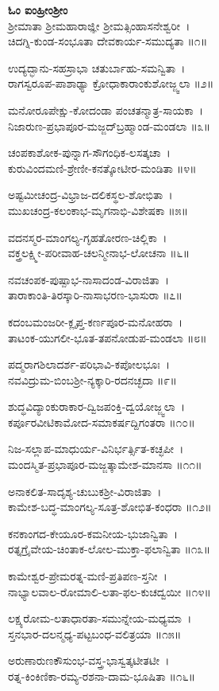 {\bfseries ಓಂ ಐಂಹ್ರೀಂಶ್ರೀಂ}\\
ಶ್ರೀಮಾತಾ ಶ್ರೀಮಹಾರಾಜ್ಞೀ ಶ್ರೀಮತ್ಸಿಂಹಾಸನೇಶ್ವರೀ~।\\
ಚಿದಗ್ನಿ-ಕುಂಡ-ಸಂಭೂತಾ ದೇವಕಾರ್ಯ-ಸಮುದ್ಯತಾ ॥೧॥

ಉದ್ಯದ್ಭಾನು-ಸಹಸ್ರಾಭಾ ಚತುರ್ಬಾಹು-ಸಮನ್ವಿತಾ~।\\
ರಾಗಸ್ವರೂಪ-ಪಾಶಾಢ್ಯಾ ಕ್ರೋಧಾಕಾರಾಂಕುಶೋಜ್ಜ್ವಲಾ ॥೨॥

ಮನೋರೂಪೇಕ್ಷು-ಕೋದಂಡಾ ಪಂಚತನ್ಮಾತ್ರ-ಸಾಯಕಾ~।\\
ನಿಜಾರುಣ-ಪ್ರಭಾಪೂರ-ಮಜ್ಜದ್‍ಬ್ರಹ್ಮಾಂಡ-ಮಂಡಲಾ ॥೩॥

ಚಂಪಕಾಶೋಕ-ಪುನ್ನಾಗ-ಸೌಗಂಧಿಕ-ಲಸತ್ಕಚಾ~।\\
ಕುರುವಿಂದಮಣಿ-ಶ್ರೇಣೀ-ಕನತ್ಕೋಟೀರ-ಮಂಡಿತಾ ॥೪॥

ಅಷ್ಟಮೀಚಂದ್ರ-ವಿಭ್ರಾಜ-ದಲಿಕಸ್ಥಲ-ಶೋಭಿತಾ~।\\
ಮುಖಚಂದ್ರ-ಕಲಂಕಾಭ-ಮೃಗನಾಭಿ-ವಿಶೇಷಕಾ ॥೫॥

ವದನಸ್ಮರ-ಮಾಂಗಲ್ಯ-ಗೃಹತೋರಣ-ಚಿಲ್ಲಿಕಾ~।\\
ವಕ್ತ್ರಲಕ್ಷ್ಮೀ-ಪರೀವಾಹ-ಚಲನ್ಮೀನಾಭ-ಲೋಚನಾ ॥೬॥

ನವಚಂಪಕ-ಪುಷ್ಪಾಭ-ನಾಸಾದಂಡ-ವಿರಾಜಿತಾ~।\\
ತಾರಾಕಾಂತಿ-ತಿರಸ್ಕಾರಿ-ನಾಸಾಭರಣ-ಭಾಸುರಾ ॥೭॥

ಕದಂಬಮಂಜರೀ-ಕ್ಲೃಪ್ತ-ಕರ್ಣಪೂರ-ಮನೋಹರಾ~।\\
ತಾಟಂಕ-ಯುಗಲೀ-ಭೂತ-ತಪನೋಡುಪ-ಮಂಡಲಾ ॥೮॥

ಪದ್ಮರಾಗಶಿಲಾದರ್ಶ-ಪರಿಭಾವಿ-ಕಪೋಲಭೂಃ~।\\
ನವವಿದ್ರುಮ-ಬಿಂಬಶ್ರೀ-ನ್ಯಕ್ಕಾರಿ-ರದನಚ್ಛದಾ ॥೯॥

ಶುದ್ಧವಿದ್ಯಾಂಕುರಾಕಾರ-ದ್ವಿಜಪಂಕ್ತಿ-ದ್ವಯೋಜ್ಜ್ವಲಾ~।\\
ಕರ್ಪೂರವೀಟಿಕಾಮೋದ-ಸಮಾಕರ್ಷದ್ದಿಗಂತರಾ ॥೧೦॥

ನಿಜ-ಸಲ್ಲಾಪ-ಮಾಧುರ್ಯ-ವಿನಿರ್ಭರ್ತ್ಸಿತ-ಕಚ್ಛಪೀ~।\\
ಮಂದಸ್ಮಿತ-ಪ್ರಭಾಪೂರ-ಮಜ್ಜತ್ಕಾಮೇಶ-ಮಾನಸಾ ॥೧೧॥

ಅನಾಕಲಿತ-ಸಾದೃಶ್ಯ-ಚುಬುಕಶ್ರೀ-ವಿರಾಜಿತಾ~।\\
ಕಾಮೇಶ-ಬದ್ಧ-ಮಾಂಗಲ್ಯ-ಸೂತ್ರ-ಶೋಭಿತ-ಕಂಧರಾ ॥೧೨॥

ಕನಕಾಂಗದ-ಕೇಯೂರ-ಕಮನೀಯ-ಭುಜಾನ್ವಿತಾ~।\\
ರತ್ನಗ್ರೈವೇಯ-ಚಿಂತಾಕ-ಲೋಲ-ಮುಕ್ತಾ-ಫಲಾನ್ವಿತಾ ॥೧೩॥

ಕಾಮೇಶ್ವರ-ಪ್ರೇಮರತ್ನ-ಮಣಿ-ಪ್ರತಿಪಣ-ಸ್ತನೀ~।\\
ನಾಭ್ಯಾಲವಾಲ-ರೋಮಾಲಿ-ಲತಾ-ಫಲ-ಕುಚದ್ವಯೀ ॥೧೪॥

ಲಕ್ಷ್ಯರೋಮ-ಲತಾಧಾರತಾ-ಸಮುನ್ನೇಯ-ಮಧ್ಯಮಾ~।\\
ಸ್ತನಭಾರ-ದಲನ್ಮಧ್ಯ-ಪಟ್ಟಬಂಧ-ವಲಿತ್ರಯಾ ॥೧೫॥

ಅರುಣಾರುಣಕೌಸುಂಭ-ವಸ್ತ್ರ-ಭಾಸ್ವತ್ಕಟೀತಟೀ~।\\
ರತ್ನ-ಕಿಂಕಿಣಿಕಾ-ರಮ್ಯ-ರಶನಾ-ದಾಮ-ಭೂಷಿತಾ ॥೧೬॥

